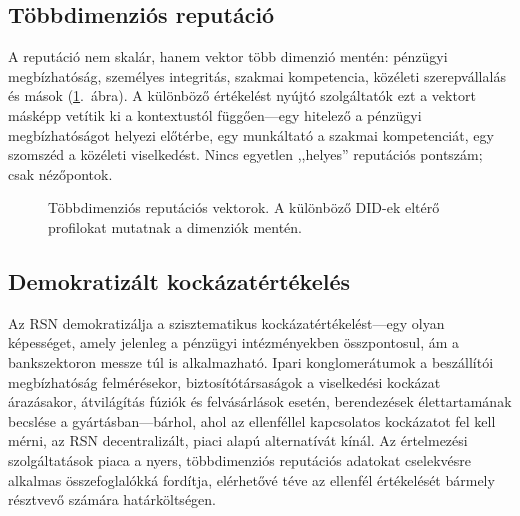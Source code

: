 \documentclass[11pt,a4paper,twocolumn]{article}
\begin{document}
\subsection{Többdimenziós reputáció}

A reputáció nem skalár, hanem vektor több dimenzió mentén: pénzügyi megbízhatóság, személyes integritás, szakmai kompetencia, közéleti szerepvállalás és mások (\ref{fig:reputation-radar}.~ábra). A különböző értékelést nyújtó szolgáltatók ezt a vektort másképp vetítik ki a kontextustól függően---egy hitelező a pénzügyi megbízhatóságot helyezi előtérbe, egy munkáltató a szakmai kompetenciát, egy szomszéd a közéleti viselkedést. Nincs egyetlen ,,helyes'' reputációs pontszám; csak nézőpontok.

\begin{figure}[ht]
\centering
{}
\caption{Többdimenziós reputációs vektorok. A különböző DID-ek eltérő profilokat mutatnak a dimenziók mentén.}
\label{fig:reputation-radar}
\end{figure}

\subsection{Demokratizált kockázatértékelés}

Az RSN demokratizálja a szisztematikus kockázatértékelést---egy olyan képességet, amely jelenleg a pénzügyi intézményekben összpontosul, ám a bankszektoron messze túl is alkalmazható. Ipari konglomerátumok a beszállítói megbízhatóság felmérésekor, biztosítótársaságok a viselkedési kockázat árazásakor, átvilágítás fúziók és felvásárlások esetén, berendezések élettartamának becslése a gyártásban---bárhol, ahol az ellenféllel kapcsolatos kockázatot fel kell mérni, az RSN decentralizált, piaci alapú alternatívát kínál. Az értelmezési szolgáltatások piaca a nyers, többdimenziós reputációs adatokat cselekvésre alkalmas összefoglalókká fordítja, elérhetővé téve az ellenfél értékelését bármely résztvevő számára határköltségen.
\end{document}
